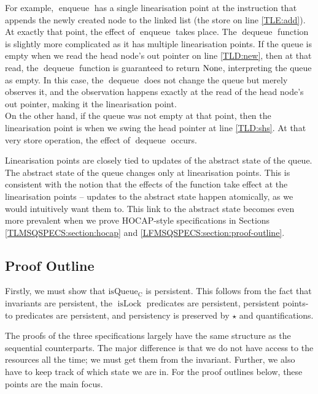 \documentclass[a4paper, 10pt]{report}
\theoremstyle{definition}
\newcommand{\isLock}{\operatorname{isLock}}
\newcommand{\enqueue}{\operatorname{enqueue}}
\newcommand{\dequeue}{\operatorname{dequeue}}
\newcommand{\isqueueconc}{\operatorname{isQueue_{C}}}
\begin{document}
For example, $\enqueue$ has a single linearisation point at the instruction that appends the newly created node to the linked list (the store on line \ref{TLE:add}). At exactly that point, the effect of $\enqueue$ takes place. The $\dequeue$ function is slightly more complicated as it has multiple linearisation points. If the queue is empty when we read the head node's out pointer on line \ref{TLD:new}, then at that read, the $\dequeue$ function is guaranteed to return $\operatorname{None}$, interpreting the queue as empty. In this case, the $\dequeue$ does not change the queue but merely observes it, and the observation happens exactly at the read of the head node's out pointer, making it the linearisation point.\\
On the other hand, if the queue was not empty at that point, then the linearisation point is when we swing the head pointer at line \ref{TLD:shs}. At that very store operation, the effect of $\dequeue$ occurs.

Linearisation points are closely tied to updates of the abstract state of the queue. The abstract state of the queue changes only at linearisation points. This is consistent with the notion that the effects of the function take effect at the linearisation points -- updates to the abstract state happen atomically, as we would intuitively want them to. This link to the abstract state becomes even more prevalent when we prove HOCAP-style specifications in Sections \ref{TLMSQSPECS:section:hocap} and \ref{LFMSQSPECS:section:proof-outline}.

\subsection{Proof Outline}
\label{TLMSQSPECS:concurrent:sub:proof-outline}

Firstly, we must show that $\isqueueconc$ is persistent. This follows from the fact that invariants are persistent, the $\isLock$ predicates are persistent, persistent points-to predicates are persistent, and persistency is preserved by $\star{}$ and quantifications.

The proofs of the three specifications largely have the same structure as the sequential counterparts. The major difference is that we do not have access to the resources all the time; we must get them from the invariant. Further, we also have to keep track of which state we are in. For the proof outlines below, these points are the main focus.
\end{document}
